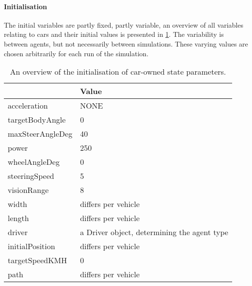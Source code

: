 \paragraph{Initialisation}
\label{par:method:model:details:initialization}
The initial variables are partly fixed, partly variable, an overview of all variables relating to cars and their initial values is presented in \cref{tab:par:method:model:details:init:car:value}. The variability is between agents, but not necessarily between simulations. These varying values are chosen arbitrarily for each run of the simulation.

\begin{table}
	\centering
	\begin{tabularx}{\textwidth}{>{\ttfamily}lX}
		\toprule
		\normalfont{Parameter}	& Value \\  
		\midrule
		acceleration 			& NONE \\ 
		targetBodyAngle 		& 0 \\ 
		maxSteerAngleDeg 		& 40 \\ 
		power 					& 250 \\ 
		wheelAngleDeg 			& 0 \\ 
		steeringSpeed 			& 5 \\ 
		visionRange 			& 8 \\ 
		width 					& differs per vehicle \\ 
		length 					& differs per vehicle \\ 
		driver 					& a Driver object, determining the agent type \\ 
		initialPosition 		& differs per vehicle \\ 
		targetSpeedKMH			& 0 \\ 
		path					& differs per vehicle \\ 
		\bottomrule
	\end{tabularx}
	\caption{An overview of the initialisation of car-owned state parameters.}
	\label{tab:par:method:model:details:init:car:value}
\end{table} 

